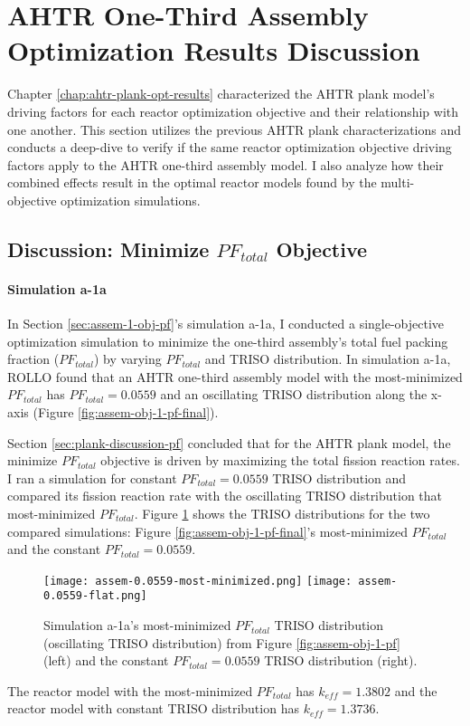 \section{AHTR One-Third Assembly Optimization Results Discussion}
\label{sec:assem-discussion}
Chapter \ref{chap:ahtr-plank-opt-results} characterized the \gls{AHTR} plank model's 
driving factors for each reactor optimization objective and their relationship with 
one another. 
This section utilizes the previous \gls{AHTR} plank characterizations and conducts 
a deep-dive to verify if the same reactor optimization objective driving factors apply 
to the \gls{AHTR} one-third assembly model. 
I also analyze how their combined effects result in the optimal reactor models found by 
the multi-objective optimization simulations. 

\subsection{Discussion: Minimize $PF_{total}$ Objective}
\label{sec:assem-discussion-pf}
\paragraph{Simulation a-1a}
In Section \ref{sec:assem-1-obj-pf}'s simulation a-1a, I conducted a single-objective 
optimization simulation to minimize the one-third assembly's total fuel packing fraction 
($PF_{total}$) by varying $PF_{total}$ and TRISO distribution. 
In simulation a-1a, \gls{ROLLO} found that an \gls{AHTR} one-third assembly model with 
the most-minimized $PF_{total}$ has $PF_{total}= 0.0559$ and an oscillating TRISO distribution 
along the x-axis (Figure \ref{fig:assem-obj-1-pf-final}).

Section \ref{sec:plank-discussion-pf} concluded that for the \gls{AHTR} plank model, 
the minimize $PF_{total}$ objective is driven by maximizing the total fission reaction 
rates. 
I ran a simulation for constant $PF_{total} = 0.0559$ TRISO distribution and compared its 
fission reaction rate with the oscillating TRISO distribution that most-minimized 
$PF_{total}$. 
Figure \ref{fig:assem-0.0559-comparison} shows the TRISO distributions for the two 
compared simulations: Figure \ref{fig:assem-obj-1-pf-final}'s most-minimized $PF_{total}$ 
and the constant $PF_{total} = 0.0559$. 
\begin{figure}[htbp!]
    \centering
    \texttt{[image: assem-0.0559-most-minimized.png]} 
    \texttt{[image: assem-0.0559-flat.png]} 
    \caption{Simulation a-1a's most-minimized $PF_{total}$ TRISO distribution 
    (oscillating TRISO distribution) from Figure \ref{fig:assem-obj-1-pf} (left) and the 
    constant $PF_{total} = 0.0559$ TRISO distribution (right).}
    \label{fig:assem-0.0559-comparison}
\end{figure}
The reactor model with the most-minimized $PF_{total}$ has $k_{eff}=1.3802$ and 
the reactor model with constant TRISO distribution has $k_{eff}=1.3736$.

